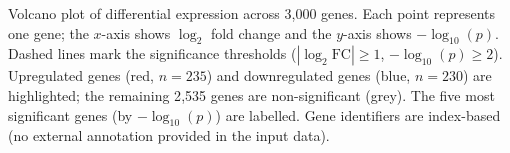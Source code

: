 \caption{Volcano plot of differential expression across 3{,}000 genes. Each point represents one gene; the $x$-axis shows $\log_2$ fold change and the $y$-axis shows $-\log_{10}(p)$. Dashed lines mark the significance thresholds ($|\log_2\text{FC}| \geq 1$, $-\log_{10}(p) \geq 2$). Upregulated genes (red, $n=235$) and downregulated genes (blue, $n=230$) are highlighted; the remaining 2{,}535 genes are non-significant (grey). The five most significant genes (by $-\log_{10}(p)$) are labelled. Gene identifiers are index-based (no external annotation provided in the input data).}
